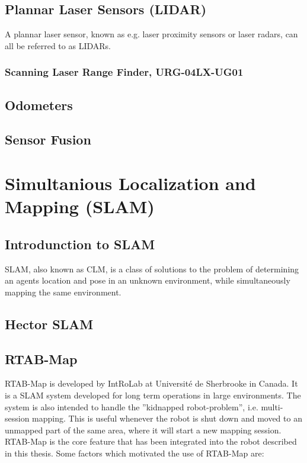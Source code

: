 \subsection{Plannar Laser Sensors (LIDAR)}

A plannar laser sensor, known as e.g. laser proximity sensors or laser radars, can all be referred to as LIDARs. 

\subsubsection{Scanning Laser Range Finder, URG-04LX-UG01}


\subsection{Odometers}

\subsection{Sensor Fusion}


\section{Simultanious Localization and Mapping (SLAM)}

\subsection{Introdunction to SLAM}

\ac{SLAM}, also known as \ac{CLM}, is a class of solutions to the problem of determining an agents location and pose in an unknown environment, while simultaneously mapping the same environment.

\subsection{Hector SLAM}

\subsection{RTAB-Map}

\ac{RTAB-Map} is developed by IntRoLab at Université de Sherbrooke in Canada. It is a \ac{SLAM} system developed for long term operations in large environments. The system is also intended to handle the ''kidnapped robot-problem'', i.e. multi-session mapping. This is useful whenever the robot is shut down and moved to an unmapped part of the same area, where it will start a new mapping session. \ac{RTAB-Map} is the core feature that has been integrated into the robot described in this thesis. Some factors which motivated the use of \ac{RTAB-Map} are:

